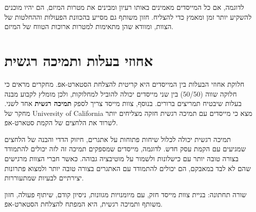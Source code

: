לדוגמה, אם כל המייסדים מאמינים באותו רעיון ומבינים את מטרות המיזם, הם יהיו מוכנים להשקיע יותר זמן ומאמץ כדי להצליח. חזון משותף גם מסייע בהכוונת הפעולות וההחלטות של הצוות, ומוודא שהן מתאימות למטרות ארוכות הטווח של המיזם.

\section{אחוזי בעלות ותמיכה רגשית}

חלוקת אחוזי הבעלות בין המייסדים היא קריטית להצלחת הסטארט-אפ. מחקרים מראים כי חלוקה שווה (50/50) בין שני מייסדים יכולה להוביל למחלוקות, ולכן מומלץ לקבוע מבנה בעלות שיבטיח תמריצים ברורים. בנוסף, צוות מייסד צריך לספק \textbf{תמיכה רגשית} אחד לשני. מחקר של University of California מצא כי מייסדים עם תמיכה רגשית חזקה מצליחים יותר לשרוד את הלחצים של הקמת סטארט-אפ.

תמיכה רגשית יכולה לכלול שיחות פתוחות על אתגרים, חיזוק הדדי והבנה של הלחצים שמגיעים עם הקמת עסק חדש. לדוגמה, מייסדים שמספקים תמיכה זה לזה יכולים להתמודד בצורה טובה יותר עם כישלונות ולשמור על מוטיבציה גבוהה. כאשר חברי הצוות מרגישים שהם לא לבד במאבקם, הם יכולים להתמודד עם האתגרים בצורה טובה יותר ולמצוא פתרונות יצירתיים לבעיות שמתעוררות.

\begin{takeaway}
שורה תחתונה: בניית צוות מייסד חזק, עם מיומנויות מגוונות, ניסיון קודם, שיתוף פעולה, חזון משותף ותמיכה רגשית, היא המפתח להצלחת הסטארט-אפ.
\end{takeaway}
